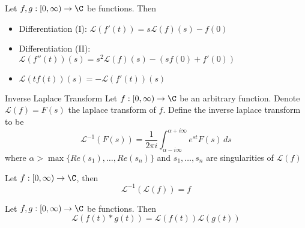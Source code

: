 \documentclass[a4paper]{article}
\begin{document}
\begin{prp}{}{} Let $f,g:[0,\infty)\to\C$ be functions. Then 
\begin{itemize}
\item Differentiation (I): $\mathcal{L}(f'(t))=s\mathcal{L}(f)(s)-f(0)$
\item Differentiation (II): $\mathcal{L}(f''(t))(s)=s^2\mathcal{L}(f)(s)-\left(sf(0)+f'(0)\right)$
\item $\mathcal{L}(tf(t))(s)=-\mathcal{L}\left(f'(t)\right)(s)$
\end{itemize}
\end{prp}

\begin{defn}{Inverse Laplace Transform}{} Let $f:[0,\infty)\to\C$ be an arbitrary function. Denote $\mathcal{L}(f)=F(s)$ the laplace transform of $f$. Define the inverse laplace transform to be $$\mathcal{L}^{-1}(F(s))=\frac{1}{2\pi i}\int_{\alpha-i\infty}^{\alpha+i\infty}e^{st}F(s)\,ds$$ where $\alpha>\max\{Re(s_1),\dots,Re(s_n)\}$ and $s_1,\dots,s_n$ are singularities of $\mathcal{L}(f)$
\end{defn}

\begin{prp}{}{} Let $f:[0,\infty)\to\C$, then $$\mathcal{L}^{-1}(\mathcal{L}(f))=f$$
\end{prp}

\begin{prp}{}{} Let $f,g:[0,\infty)\to\C$ be functions. Then $$\mathcal{L}(f(t)\ast g(t))=\mathcal{L}(f(t))\mathcal{L}(g(t))$$
\end{prp}
\end{document}
